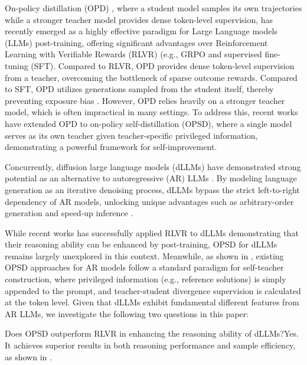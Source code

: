 \documentclass{article}
\begin{document}
On-policy distillation (OPD) \citep{agarwal2024policy,yang2025qwen3,lu2025onpolicydistillation,li2026rethinking}, where a student model samples its own trajectories while a stronger teacher model provides dense token-level supervision, has recently emerged as a highly effective paradigm for Large Language models (LLMs) post-training, offering significant advantages over Reinforcement Learning with Verifiable Rewards (RLVR) (e.g., GRPO \citep{guo2025deepseek} and supervised fine-tuning (SFT). Compared to RLVR, OPD provides dense token-level supervision from a teacher, overcoming the bottleneck of sparse outcome rewards. Compared to SFT, OPD utilizes generations sampled from the student itself, thereby preventing exposure bias \citep{bengio2015scheduled}. However, OPD relies heavily on a stronger teacher model, which is often impractical in many settings. To address this, recent works \citep{zhao2026self, hubotter2026reinforcement, shenfeld2026self} have extended OPD to on-policy self-distillation (OPSD), where a single model serves as its own teacher given teacher-specific privileged information, demonstrating a powerful framework for self-improvement.

Concurrently, diffusion large language models (dLLMs) \citep{ou2024your, nie2025large, ye2025dream, cheng2025sdar, bie2025llada2} have demonstrated strong potential as an alternative to autoregressive (AR) LLMs \citep{jaech2024openai, xiao2026mimo}. By modeling language generation as an iterative denoising process, dLLMs bypass the strict left-to-right dependency of AR models, unlocking unique advantages such as arbitrary-order generation and speed-up inference \citep{khanna2025mercury, song2025seed, wu2025fast}.

While recent works \citep{zhao2025d1, tang2025wd1, xie2025step} has successfully applied RLVR to dLLMs demonstrating that their reasoning ability can be enhanced by post-training, OPSD for dLLMs remains largely unexplored in this context. Meanwhile, as shown in , existing OPSD approaches for AR models follow a standard paradigm for self-teacher construction, where privileged information (e.g., reference solutions) is simply appended to the prompt, and teacher-student divergence supervision is calculated at the token level. Given that dLLMs exhibit fundamental different features from AR LLMs, we investigate the following two questions in this paper:

{Does OPSD outperform RLVR in enhancing the reasoning ability of dLLMs?}{Yes. It achieves superior results in both reasoning performance and sample efficiency, as shown in .}
\end{document}
